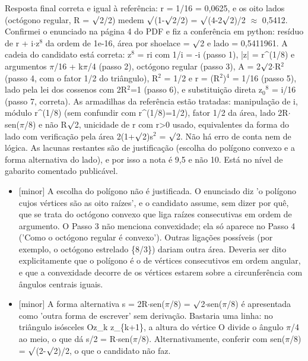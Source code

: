 \documentclass{article}%
\begin{document}
Resposta final correta e igual à referência: r = 1/16 = 0,0625, e os oito lados (octógono regular, R = $\surd$2/2) medem $\surd$(1-$\surd$2/2) = $\surd$(4-2$\surd$2)/2 $\approx$ 0,5412. Confirmei o enunciado na página 4 do PDF e fiz a conferência em python: resíduo de r + i$\cdot$z$^{8}$ da ordem de 1e{-}16, área por shoelace = $\surd$2 e lado = 0,5411961. A cadeia do candidato está correta: z$^{8}$ = ri com 1/i = -i (passo 1), |z| = r\^{}(1/8) e argumentos $\pi$/16 + k$\pi$/4 (passo 2), octógono regular (passo 3), A = 2$\surd$2$\cdot$R$^2$ (passo 4, com o fator 1/2 do triângulo), R$^2$ = 1/2 e r = (R$^2$)$^{4}$ = 1/16 (passo 5), lado pela lei dos cossenos com 2R$^2$=1 (passo 6), e substituição direta z$_{0}$$^{8}$ = i/16 (passo 7, correta). As armadilhas da referência estão tratadas: manipulação de i, módulo r\^{}(1/8) (sem confundir com r\^{}(1/8)=1/2), fator 1/2 da área, lado 2R$\cdot$sen($\pi$/8) e não R$\surd$2, unicidade de r com r>0 usado, equivalentes da forma do lado com verificação pela área 2(1+$\surd$2)s$^2$ = $\surd$2. Não há erro de conta nem de lógica. As lacunas restantes são de justificação (escolha do polígono convexo e a forma alternativa do lado), e por isso a nota é 9,5 e não 10. Está no nível de gabarito comentado publicável.%
\begin{itemize}%
\item%
{[}minor{]} A escolha do polígono não é justificada. O enunciado diz 'o polígono cujos vértices são as oito raízes', e o candidato assume, sem dizer por quê, que se trata do octógono convexo que liga raízes consecutivas em ordem de argumento. O Passo 3 não menciona convexidade; ela só aparece no Passo 4 ('Como o octógono regular é convexo'). Outras ligações possíveis (por exemplo, o octógono estrelado \{8/3\}) dariam outra área. Deveria ser dito explicitamente que o polígono é o de vértices consecutivos em ordem angular, e que a convexidade decorre de os vértices estarem sobre a circunferência com ângulos centrais iguais.%
\item%
{[}minor{]} A forma alternativa s = 2R$\cdot$sen($\pi$/8) = $\surd$2$\cdot$sen($\pi$/8) é apresentada como 'outra forma de escrever' sem derivação. Bastaria uma linha: no triângulo isósceles Oz\_k z\_\{k+1\}, a altura do vértice O divide o ângulo $\pi$/4 ao meio, o que dá s/2 = R$\cdot$sen($\pi$/8). Alternativamente, conferir com sen($\pi$/8) = $\surd$(2-$\surd$2)/2, o que o candidato não faz.%
\end{itemize}%
\end{document}
